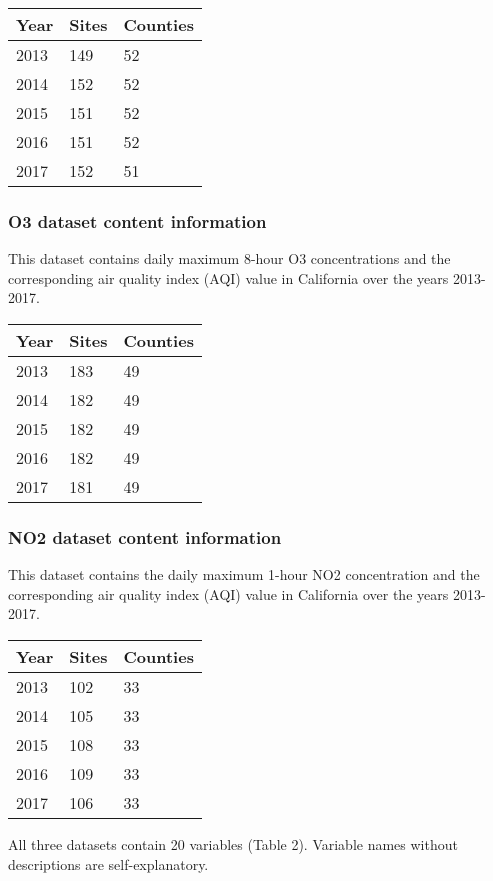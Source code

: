 \documentclass[12pt,]{article}
\begin{document}
\begin{longtable}[]{@{}lll@{}}
\toprule
Year & Sites & Counties\tabularnewline
\midrule
\endhead
2013 & 149 & 52\tabularnewline
2014 & 152 & 52\tabularnewline
2015 & 151 & 52\tabularnewline
2016 & 151 & 52\tabularnewline
2017 & 152 & 51\tabularnewline
\bottomrule
\end{longtable}

\hypertarget{o3-dataset-content-information}{%
\subsubsection{O3 dataset content
information}\label{o3-dataset-content-information}}

This dataset contains daily maximum 8-hour O3 concentrations and the
corresponding air quality index (AQI) value in California over the years
2013-2017.

\begin{longtable}[]{@{}lll@{}}
\toprule
Year & Sites & Counties\tabularnewline
\midrule
\endhead
2013 & 183 & 49\tabularnewline
2014 & 182 & 49\tabularnewline
2015 & 182 & 49\tabularnewline
2016 & 182 & 49\tabularnewline
2017 & 181 & 49\tabularnewline
\bottomrule
\end{longtable}

\hypertarget{no2-dataset-content-information}{%
\subsubsection{NO2 dataset content
information}\label{no2-dataset-content-information}}

This dataset contains the daily maximum 1-hour NO2 concentration and the
corresponding air quality index (AQI) value in California over the years
2013-2017.

\begin{longtable}[]{@{}lll@{}}
\toprule
Year & Sites & Counties\tabularnewline
\midrule
\endhead
2013 & 102 & 33\tabularnewline
2014 & 105 & 33\tabularnewline
2015 & 108 & 33\tabularnewline
2016 & 109 & 33\tabularnewline
2017 & 106 & 33\tabularnewline
\bottomrule
\end{longtable}

All three datasets contain 20 variables (Table 2). Variable names
without descriptions are self-explanatory.
\end{document}
